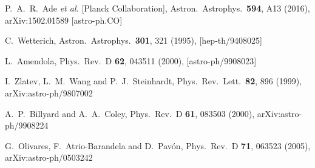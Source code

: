 \documentclass[superscriptaddress,oneolumn,secnumarabic,
amssymb,amsmath,nobibnotes,aps,prd,showpacs,nofootinbib]{revtex4}%
\begin{document}
\begin{thebibliography}{*}


P.~A.~R.~Ade {\it et al.} [Planck Collaboration],
Astron.\ Astrophys.\  {\bf 594}, A13 (2016),
arXiv:1502.01589 [astro-ph.CO]


  C.~Wetterich,
  Astron.\ Astrophys.\  {\bf 301}, 321 (1995),
  [hep-th/9408025]


  L.~Amendola,
  Phys.\ Rev.\ D {\bf 62}, 043511 (2000),
  [astro-ph/9908023]


I.~Zlatev, L.~M.~Wang and P.~J.~Steinhardt,
Phys.\ Rev.\ Lett.\  {\bf 82}, 896 (1999),
arXiv:astro-ph/9807002




  A.~P.~Billyard and A.~A.~Coley,
  Phys.\ Rev.\ D {\bf 61}, 083503 (2000),
  arXiv:astro-ph/9908224


G.~Olivares, F.~Atrio-Barandela and D.~Pav\'on,
Phys.\ Rev.\ D {\bf 71}, 063523 (2005),
arXiv:astro-ph/0503242






\end{thebibliography}
\end{document}

